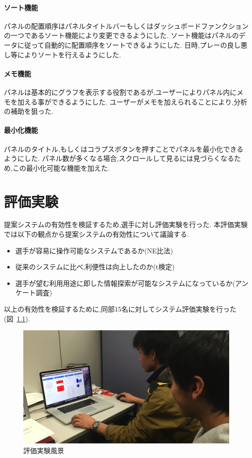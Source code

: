 \documentclass[sotsuron]{kuee}
\begin{document}
			\subsubsection{ソート機能}
			パネルの配置順序はパネルタイトルバーもしくはダッシュボードファンクションの一つであるソート機能により変更できるようにした.
			ソート機能はパネルのデータに従って自動的に配置順序をソートできるようにした.
			日時,プレーの良し悪し等によりソートを行えるようにした.
			\subsubsection{メモ機能}
			パネルは基本的にグラフを表示する役割であるが,ユーザーによりパネル内にメモを加える事ができるようにした.
			ユーザーがメモを加えられることにより,分析の補助を狙った.
			\subsubsection{最小化機能}
			パネルのタイトル,もしくはコラプスボタンを押すことでパネルを最小化できるようにした.
			パネル数が多くなる場合,スクロールして見るには見づらくなるため,この最小化可能な機能を加えた.

\chapter{評価実験}
	提案システムの有効性を検証するため,選手に対し評価実験を行った.
	本評価実験では以下の観点から提案システムの有効性について議論する.
	\begin{itemize}
		\item 選手が容易に操作可能なシステムであるか(NE比法)
		\item 従来のシステムに比べ,利便性は向上したのか(t検定)
		\item 選手が望む利用用途に即した情報探索が可能なシステムになっているか(アンケート調査)
	\end{itemize}
	以上の有効性を検証するために,同部15名に対してシステム評価実験を行った(図~\ref{fig:experi}).
		\begin{figure}
			\begin{center}
				\includegraphics[width=\linewidth]{./png/experience.png}
			\end{center}
			\caption{評価実験風景}
	  		\label{fig:experi}
		\end{figure}
\end{document}
